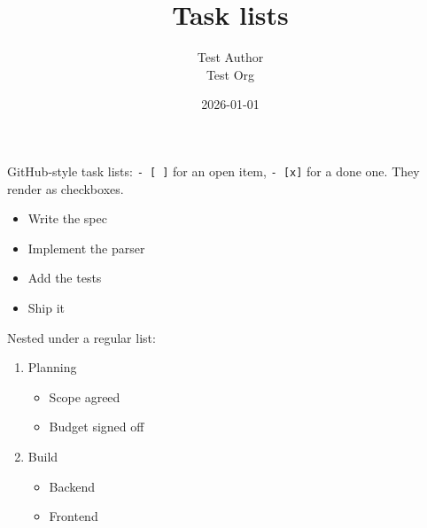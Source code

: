 \documentclass[11pt,a4paper]{article}
\title{Task lists}
\author{Test Author \\ Test Org}
\date{2026-01-01}
\theoremstyle{definition}
\begin{document}
\maketitle

GitHub-style task lists: \texttt{- [ ]} for an open item, \texttt{- [x]} for a done
one. They render as checkboxes.


\begin{itemize}
  \item[$\boxtimes$] Write the spec
  \item[$\boxtimes$] Implement the parser
  \item[$\square$] Add the tests
  \item[$\square$] Ship it
\end{itemize}


Nested under a regular list:


\begin{enumerate}
  \item Planning

\begin{itemize}
  \item[$\boxtimes$] Scope agreed
  \item[$\square$] Budget signed off
\end{itemize}
  \item Build

\begin{itemize}
  \item[$\square$] Backend
  \item[$\square$] Frontend
\end{itemize}
\end{enumerate}
\end{document}
